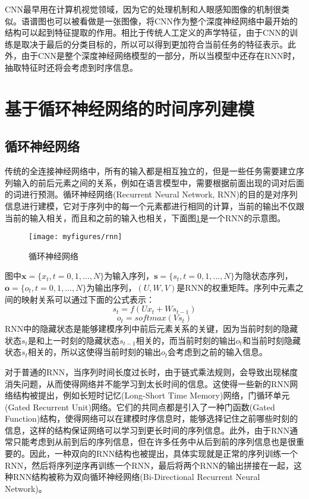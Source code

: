 CNN最早用在计算机视觉领域，因为它的处理机制和人眼感知图像的机制很类似。语谱图也可以被看做是一张图像，将CNN作为整个深度神经网络中最开始的结构可以起到特征提取的作用。相比于传统人工定义的声学特征，由于CNN的训练是取决于最后的分类目标的，所以可以得到更加符合当前任务的特征表示。此外，由于CNN是整个深度神经网络模型的一部分，所以当模型中还存在RNN时，抽取特征时还将会考虑到时序信息。

\section{基于循环神经网络的时间序列建模}
\label{sec:rnn_seq_model}

\subsection{循环神经网络}
\label{ssec:rnn}

传统的全连接神经网络中，所有的输入都是相互独立的，但是一些任务需要建立序列输入的前后元素之间的关系，例如在语言模型中，需要根据前面出现的词对后面的词进行预测。循环神经网络(Recurrent Neural Network, RNN)的目的是对序列信息进行建模，它对于序列中的每一个元素都进行相同的计算，当前的输出不仅跟当前的输入相关，而且和之前的输入也相关，下面图\ref{fig:rnn}是一个RNN的示意图。

\begin{figure}[htb] %
    \centering
    \texttt{[image: myfigures/rnn]}
    \caption{循环神经网络}
    \label{fig:rnn}
\end{figure}

图中$\mathbf{x}=\{x_t, t=0,1,...,N\}$为输入序列，$\mathbf{s}=\{s_t, t=0,1,...,N\}$为隐状态序列，$\mathbf{o}=\{o_t, t=0,1,...,N\}$为输出序列，$(U, W, V)$是RNN的权重矩阵。序列中元素之间的映射关系可以通过下面的公式表示：
\begin{equation}
\label{equ:rnn_cal_state}
    s_t = f(Ux_t + Ws_{t-1})
\end{equation}
\begin{equation}
\label{equ:rnn_cal_output}
    o_t = softmax(Vs_t)
\end{equation}
RNN中的隐藏状态是能够建模序列中前后元素关系的关键，因为当前时刻的隐藏状态$s_t$是和上一时刻的隐藏状态$s_{t-1}$相关的，而当前时刻的输出$o_t$和当前时刻隐藏状态$s_t$相关的，所以这使得当前时刻的输出$o_t$会考虑到之前的输入信息。

对于普通的RNN，当序列时间长度过长时，由于链式乘法规则，会导致出现梯度消失问题，从而使得网络并不能学习到太长时间的信息。这使得一些新的RNN网络结构被提出，例如长短时记忆(Long-Short Time Memory)网络，门循环单元(Gated Recurrent Unit)网络。它们的共同点都是引入了一种门函数(Gated Function)结构，使得网络可以在建模时序信息时，能够选择记住之前哪些时刻的信息，这样的结构保证网络可以学习到更长时间的序列信息。此外，由于RNN通常只能考虑到从前到后的序列信息，但在许多任务中从后到前的序列信息也是很重要的。因此，一种双向的RNN结构也被提出，具体实现就是正常的序列训练一个RNN，然后将序列逆序再训练一个RNN，最后将两个RNN的输出拼接在一起，这种RNN结构被称为双向循环神经网络(Bi-Directional Recurrent Neural Network)。


